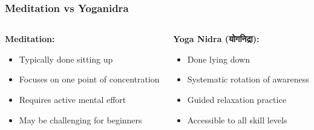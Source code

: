 \begin{frame}[fragile]\frametitle{Meditation vs Yoganidra}
    \begin{columns}
        \begin{column}{0.48\textwidth}
            \textbf{Meditation:}
            \begin{itemize}
                \item Typically done sitting up
                \item Focuses on one point of concentration
                \item Requires active mental effort
                \item May be challenging for beginners
            \end{itemize}
        \end{column}
        \begin{column}{0.48\textwidth}
            \textbf{Yoga Nidra (योगनिद्रा):}
            \begin{itemize}
                \item Done lying down
                \item Systematic rotation of awareness
                \item Guided relaxation practice
                \item Accessible to all skill levels
            \end{itemize}
        \end{column}
    \end{columns}
\end{frame}


